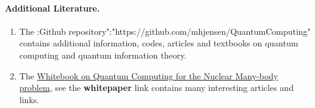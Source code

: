 \documentclass[%
oneside,                 %
final,                   %
10pt]{article}
\begin{document}
\paragraph{Additional Literature.}
\begin{enumerate}
\item The :Github repository":"https://github.com/mhjensen/QuantumComputing" contains additional information, codes, articles and textbooks on quantum computing and quantum information theory.

\item The \href{{http://www.int.washington.edu/PROGRAMS/17-66W/}}{Whitebook on Quantum Computing for the Nuclear Many-body problem}, see the \textbf{whitepaper} link contains many interesting articles and links. 
\end{enumerate}

\noindent

\end{document}
